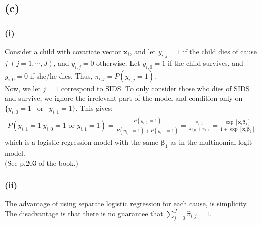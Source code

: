 \subsection*{(c)}
\subsubsection*{(i)}
Consider a child with covariate vector $\bm{x}_i$, and let $y_{i,j} = 1$ if the child dies of cause $j$ $(j = 1, \cdots, J)$, and $y_{i,j} = 0$ otherwise. Let $y_{i,0} = 1$ if the child survives, and $y_{i,0} = 0$ if she/he dies. Thus, $\pi_{i,j} = P(y_{i,j} = 1)$.\\

Now, we let $j=1$ correspond to SIDS. To only consider those who dies of SIDS and survive, we ignore the irrelevant part of the model and condition only on $\{y_{i,0} = 1$ \mbox{~or~} $y_{i,1} = 1\}$. This gives:
\begin{align*}
P(y_{i,1} = 1 | y_{i,0} = 1 \mbox{~or~} y_{i,1} = 1) = \frac{P(y_{i,1} = 1)}{P(y_{i,0} = 1) + P(y_{i,1} = 1)} = \frac{\pi_{i,1}}{\pi_{i,0}+\pi_{i,1}} = \frac{\exp\left[\bm{x}_{i}\bm{\beta}_{1}\right]}{1+\exp\left[\bm{x}_{i}\bm{\beta}_{1}\right]}
\end{align*}
which is a logistic regression model with the same $\bm{\beta}_{1}$ as in the multinomial logit model.\\
(See p.203 of the book.)\\

\subsubsection*{(ii)}
The advantage of using separate logistic regression for each cause, is simplicity.\\
The disadvantage is that there is no guarantee that $\sum_{j=0}^{J} \widehat{\pi}_{i,j} = 1$.

